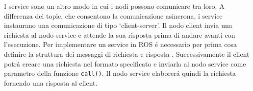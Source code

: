 I service sono un altro modo in cui i nodi possono comunicare tra loro. A differenza dei topic, che consentono la comunicazione 
asincrona, i service instaurano una comunicazione di tipo `client-server'. Il nodo client invia una richiesta al nodo service e 
attende la sua risposta prima di andare avanti con l'esecuzione. 
Per implementare un service in ROS \'{e} necessario per prima cosa definire la struttura dei messaggi di richiesta e 
risposta \cite{service}. Successivamente il client potr\'{a} creare una richiesta nel formato specificato e inviarla al nodo service  
come parametro della funzione \verb|call()|. 
Il nodo service elaborer\'{a} quindi la richiesta fornendo una risposta al client.